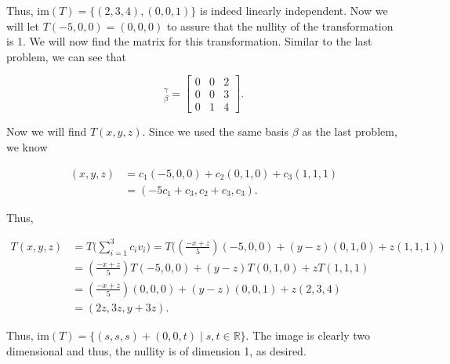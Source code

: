 \documentclass[12pt, a4paper]{article}
\begin{document}
 \vspace{2mm}
 
 \noindent Thus, $\text{im}(T)=\{(2,3,4),(0,0,1)\}$ is indeed linearly independent. Now we will let $T(-5,0,0)=(0,0,0)$ to assure that the nullity of the transformation is 1. We will now find the matrix for this transformation. Similar to the last problem, we can see that 
 
 \begin{equation*}
     [T]_{\beta}^{\gamma}=\begin{bmatrix} 0 & 0 & 2 \\ 0 & 0 & 3 \\ 0 & 1 & 4 \end{bmatrix}.
 \end{equation*}
 
 \vspace{2mm}
 
 \noindent Now we will find $T(x,y,z)$. Since we used the same basis $\beta$ as the last problem, we know 
 
 \begin{equation*}
    \begin{split}
     (x,y,z) &= c_1(-5,0,0)+c_2(0,1,0)+c_3(1,1,1) \\
         &= (-5c_1+c_3, c_2+c_3, c_3).
    \end{split}
 \end{equation*}
 
 \vspace{2mm}
 
 \noindent Thus,
 
 \begin{equation*}
     \begin{split}
         T(x,y,z) &= T\bigg(\sum\limits_{i=1}^3c_iv_i\bigg)=T\bigg((\frac{-x+z}{5})(-5,0,0)+(y-z)(0,1,0)+z(1,1,1)\bigg) \\ &= (\frac{-x+z}{5})T(-5,0,0)+(y-z)T(0,1,0)+zT(1,1,1) \\
        &= (\frac{-x+z}{5})(0,0,0)+(y-z)(0,0,1)+z(2,3,4) \\
        &= (2z,3z,y+3z).
     \end{split}
 \end{equation*}
 
 \newpage
 
 \noindent Thus, $\text{im}(T)=\{(s,s,s)+(0,0,t)\mid s,t\in\mathbb{R}\}$. The image is clearly two dimensional and thus, the nullity is of dimension 1, as desired.
 
 \vspace{8mm}
 
\end{document}
